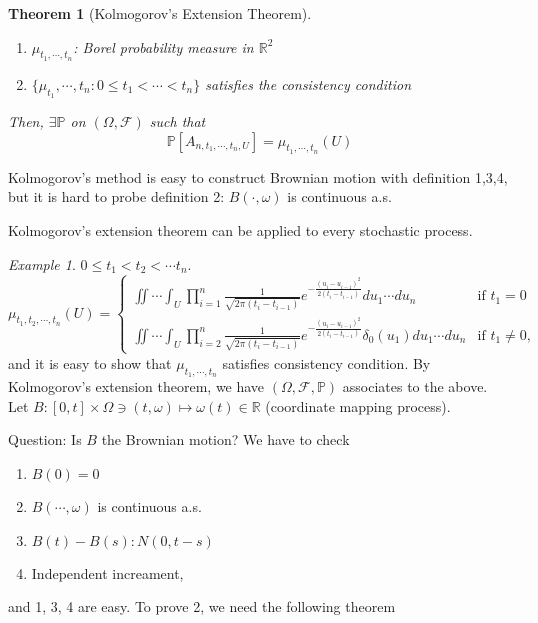 \documentclass[12pt]{report}
\newcommand{\R}{\mathbb{R}}
\renewcommand{\P}{\mathbb{P}}
\newcommand{\F}{\mathcal{F}}
\renewcommand{\1}{\mathbb{1}}
\renewcommand{\O}{\Omega}
\theoremstyle{break}
\newtheorem{thm}{Theorem}[section] %
\theoremstyle{newdef}
\theoremstyle{remark}
\newtheorem*{exmp}{Example} %
\begin{document}
\begin{thm}[Kolmogorov's Extension Theorem]
\leavevmode
\vspace{-6mm}
\begin{enumerate}
\item $\mu_{t_1,\cdots,t_n}$: Borel probability measure in $\R^2$
\item $\{ \mu_{t_1},\cdots,t_n: 0\leq t_1<\cdots<t_n\}$ satisfies the consistency condition
\end{enumerate}
Then, $\exists \P$ on $(\O,\F)$ such that
$$\P[A_{n,t_1,\cdots,t_n,U}]=\mu_{t_1,\cdots,t_n}(U)$$
\end{thm}

Kolmogorov's method is easy to construct Brownian motion with definition 1,3,4, but it is hard to probe definition 2: $B(\cdot,\omega)$ is continuous a.s.

Kolmogorov's extension theorem can be applied to every stochastic process.



\begin{exmp}
$0\leq t_1 < t_2 < \cdots t_n$.
$$\mu_{t_1,t_2,\cdots,t_n}(U) =
\begin{cases}
\iint \cdots \int_U \prod_{i=1}^{n} \frac{1}{\sqrt{2\pi(t_i-t_{i-1})}} e^{-\frac{(u_i-u_{i-1})^2}{2(t_i-t_{i-1})}} du_1\cdots du_n & \text{if } t_1 = 0\\
\iint \cdots \int_U \prod_{i=2}^{n} \frac{1}{\sqrt{2\pi(t_i-t_{i-1})}} e^{-\frac{(u_i-u_{i-1})^2}{2(t_i-t_{i-1})}} \delta_0(u_1)du_1\cdots du_n & \text{if } t_1 \neq 0,
\end{cases}
$$
and it is easy to show that $\mu_{t_1,\cdots,t_n}$ satisfies consistency condition.
By Kolmogorov's extension theorem, we have $(\O,\F,\P)$ associates to the above.
Let $B : [0,t] \times \O \ni (t,\omega) \mapsto \omega(t) \in \R$ (coordinate mapping process).

Question: Is $B$ the Brownian motion? We have to check
\begin{enumerate}
\item $B(0) = 0$
\item $B(\cdots, \omega)$ is continuous a.s.
\item $B(t)-B(s): N(0,t-s)$
\item Independent increament,
\end{enumerate}
and 1, 3, 4 are easy.
To prove 2, we need the following theorem
\end{exmp}
\end{document}
